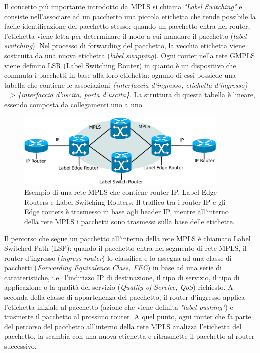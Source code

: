 \documentclass[10pt,a4paper]{report}
\begin{document}
Il concetto più importante introdotto da MPLS si chiama \textit{"Label
  Switching"} e consiste nell'associare ad un pacchetto una piccola
etichetta che rende possibile la facile identificazione del pacchetto
stesso: quando un pacchetto entra nel router, l'etichetta viene letta
per determinare il nodo a cui mandare il pacchetto (\textit{label
  switching}). Nel processo di forwarding del pacchetto, la vecchia
etichetta viene sostituita da una nuova etichetta (\textit{label
  swapping}). Ogni router nella rete GMPLS viene definito LSR (Label
Switching Router) in quanto è un dispositivo che commuta i pacchetti
in base alla loro etichetta: ognuno di essi possiede una tabella che
contiene le associazioni \textit{\{interfaccia d'ingresso, etichetta
  d'ingresso\} => \{interfaccia d'uscita, porta d'uscita\}}. La
struttura di questa tabella è lineare, essendo composta da
collegamenti uno a uno.

\begin{figure}[!hbp]
  \centering
  \includegraphics[width=0.9\textwidth]{img/mpls_net}
  \caption[]{Esempio di una rete MPLS che contiene router IP, Label
    Edge Routers e Label Switching Routers. Il traffico tra i router
    IP e gli Edge routers è trasmesso in base agli header IP, mentre
    all'interno della rete MPLS i pacchetti sono trasmessi sulla base
    delle etichette.}
\end{figure}

Il percorso che segue un pacchetto all'interno della rete MPLS è
chiamato Label Switched Path (LSP): quando il pacchetto entra nel
segmento di rete MPLS, il router d'ingresso (\textit{ingress router})
lo classifica e lo assegna ad una classe di pacchetti
(\textit{Forwarding Equivalence Class, FEC}) in base ad una serie di
caratteristiche, i.e.\ l'indirizzo IP di destinazione, il tipo di
servizio, il tipo di applicazione o la qualità del servizio
(\textit{Quality of Service, QoS}) richiesto. A seconda della classe
di appartenenza del pacchetto, il router d'ingresso applica
l'etichetta iniziale al pacchetto (azione che viene definita
\textit{"label pushing"}) e trasmette il pacchetto al prossimo
router. A quel punto, ogni router che fa parte del percorso del pacchetto
all'interno della rete MPLS analizza l'etichetta del pacchetto, la
scambia con una nuova etichetta e ritrasmette il pacchetto al router
successivo. 
\end{document}
